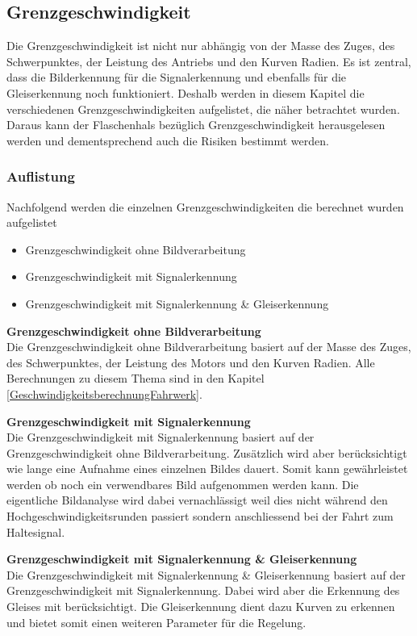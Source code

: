 \documentclass[../../main.tex]{subfiles}
\begin{document}
\subsection{Grenzgeschwindigkeit}
Die Grenzgeschwindigkeit ist nicht nur abhängig von der Masse des Zuges, des Schwerpunktes, der Leistung des Antriebs und den Kurven Radien.
Es ist zentral, dass die Bilderkennung für die Signalerkennung und ebenfalls für die Gleiserkennung noch funktioniert.
Deshalb werden in diesem Kapitel die verschiedenen Grenzgeschwindigkeiten aufgelistet, die näher betrachtet wurden.
Daraus kann der Flaschenhals bezüglich Grenzgeschwindigkeit herausgelesen werden und dementsprechend auch die Risiken
bestimmt werden.

\subsubsection{Auflistung}
Nachfolgend werden die einzelnen Grenzgeschwindigkeiten die berechnet wurden aufgelistet
\begin{itemize} %
    \item Grenzgeschwindigkeit ohne Bildverarbeitung
    \item Grenzgeschwindigkeit mit Signalerkennung
    \item Grenzgeschwindigkeit mit Signalerkennung \& Gleiserkennung
\end{itemize}

\textbf{Grenzgeschwindigkeit ohne Bildverarbeitung} \\
Die Grenzgeschwindigkeit ohne Bildverarbeitung basiert auf der Masse des Zuges, des Schwerpunktes, der Leistung des Motors und den Kurven Radien.
Alle Berechnungen zu diesem Thema sind in den Kapitel \ref{GeschwindigkeitsberechnungFahrwerk}.

\textbf{Grenzgeschwindigkeit mit Signalerkennung} \\
Die Grenzgeschwindigkeit mit Signalerkennung basiert auf der Grenzgeschwindigkeit ohne Bildverarbeitung. Zusätzlich wird aber berücksichtigt wie lange eine
Aufnahme eines einzelnen Bildes dauert. Somit kann gewährleistet werden ob noch ein verwendbares Bild aufgenommen werden kann. Die eigentliche Bildanalyse
wird dabei vernachlässigt weil dies nicht während den Hochgeschwindigkeitsrunden passiert sondern anschliessend bei der Fahrt zum Haltesignal.

\textbf{Grenzgeschwindigkeit mit Signalerkennung \& Gleiserkennung} \\
Die Grenzgeschwindigkeit mit Signalerkennung \& Gleiserkennung basiert auf der Grenzgeschwindigkeit mit Signalerkennung. Dabei wird aber die Erkennung des Gleises
mit berücksichtigt. Die Gleiserkennung dient dazu Kurven zu erkennen und bietet somit einen weiteren Parameter für die Regelung.
\end{document}
